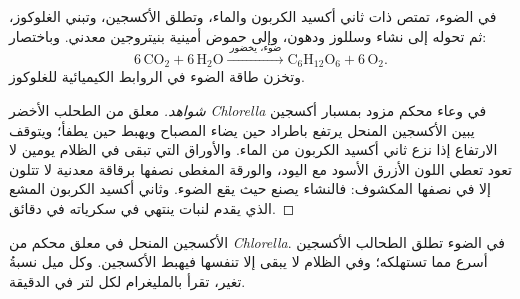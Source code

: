\begin{proposition}\label{prop:g10:cell-metabolism:photosynthesis}
في الضوء، تمتص  ذات  ثاني أكسيد الكربون
والماء، وتطلق الأكسجين، وتبني الغلوكوز، ثم تحوله إلى نشاء وسللوز
ودهون، وإلى حموض أمينية بنيتروجين معدني. وباختصار:
\[
6\,\mathrm{CO_2} + 6\,\mathrm{H_2O} \xrightarrow{\ \text{ضوء، يخضور}\ }
\mathrm{C_6H_{12}O_6} + 6\,\mathrm{O_2}.
\]
وتخزن طاقة الضوء في الروابط الكيميائية للغلوكوز.
\end{proposition}
\begin{proof}[شواهد]
معلق من الطحلب الأخضر \emph{Chlorella} في وعاء محكم مزود بمسبار
أكسجين يبين الأكسجين المنحل يرتفع باطراد حين يضاء المصباح ويهبط حين
يطفأ؛ ويتوقف الارتفاع إذا نزع ثاني أكسيد الكربون من الماء. والأوراق
التي تبقى في الظلام يومين لا تعود تعطي اللون الأزرق الأسود مع اليود،
والورقة المغطى نصفها برقاقة معدنية لا تتلون إلا في نصفها المكشوف:
فالنشاء يصنع حيث يقع الضوء. وثاني أكسيد الكربون المشع الذي يقدم لنبات
ينتهي في سكرياته في دقائق.
\end{proof}

\begin{omfigure}

{\small الأكسجين المنحل في معلق محكم من \emph{Chlorella}. في الضوء
تطلق الطحالب الأكسجين أسرع مما تستهلكه؛ وفي الظلام لا يبقى إلا تنفسها
فيهبط الأكسجين. وكل ميل نسبةُ تغير، تقرأ بالمليغرام لكل لتر في
الدقيقة.}
\end{omfigure}

